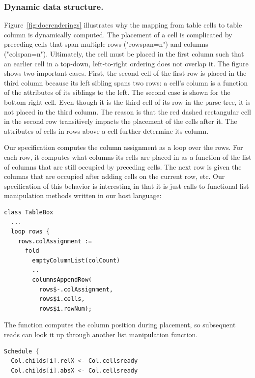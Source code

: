 \subsubsection{Dynamic data structure.}
Figure~\ref{fig:docrenderings} illustrates why the mapping from table cells to table column is dynamically computed. The placement of a cell is complicated by preceding cells that span multiple rows ("rowspan=n") and columns ("colspan=n"). Ultimately, the cell must be placed in the first column such that an earlier cell in a top-down, left-to-right ordering does not overlap it. The figure shows two important cases. First, the second cell of the first row is placed in the third column because its left sibling spans two rows: a cell's column is a function of the  attributes of its siblings to the left.  The second case is shown for the bottom right cell. Even though it is the third cell of its row in the parse tree, it is not placed in the third column. The reason is that the red dashed rectangular cell in the second row transitively impacts the placement of the cells after it. The  attributes of cells in rows above a cell further determine its column.

Our specification computes the column assignment as a loop over the rows. For each row, it computes what columns its cells are placed in as a function of the list of columns that are still occupied by preceding cells. The next row is given the columns that are occupied after adding cells on the current row, etc. Our specification of this behavior is interesting in that it is just calls to functional list manipulation methods written in our host language:
\begin{lstlisting}
class TableBox
  ...
  loop rows {
    rows.colAssignment := 
      fold 
        emptyColumnList(colCount) 
        .. 
        columnsAppendRow(
          rows$-.colAssignment, 
          rows$i.cells, 
          rows$i.rowNum);
\end{lstlisting}
The  function computes the column position during placement, so subsequent reads can look it up through another list manipulation function.





\newsavebox{\tabledyna}
\begin{lrbox}{\tabledyna}%
\begin{lstlisting}[language=C++,morekeywords={spawn,join,reverse,parallel_for}]
Schedule {
  Col.childs[i].relX <- Col.cellsready
  Col.childs[i].absX <- Col.cellsready
\end{lstlisting}
\end{lrbox}

